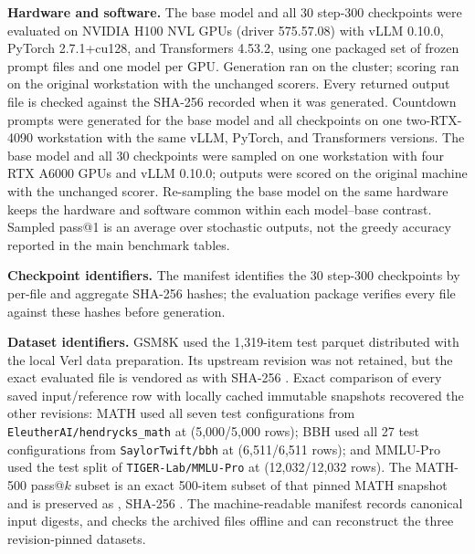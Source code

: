 \documentclass[11pt]{article}
\begin{document}
\noindent\textbf{Hardware and software.} The base model and all 30 step-300 checkpoints were evaluated on NVIDIA H100 NVL GPUs (driver 575.57.08) with
vLLM 0.10.0, PyTorch 2.7.1+cu128, and Transformers 4.53.2, using one packaged set of frozen prompt files and
one model per GPU. Generation ran on the cluster; scoring ran on the original workstation with the unchanged
scorers. Every returned output file is checked against the SHA-256 recorded when it was generated. Countdown prompts were generated for the base model and all checkpoints on one two-RTX-4090 workstation with the same vLLM, PyTorch, and Transformers versions. The base model and all 30 checkpoints were sampled on one workstation with four RTX A6000 GPUs and vLLM 0.10.0; outputs were scored on the original machine with the unchanged scorer. Re-sampling the base model on the same hardware keeps the hardware and software common within each model--base contrast. Sampled pass@1 is an average over stochastic outputs, not the greedy accuracy reported in the main benchmark tables.

\noindent\textbf{Checkpoint identifiers.} The manifest  identifies the 30 step-300 checkpoints by per-file and aggregate SHA-256 hashes; the evaluation package verifies every file against these hashes before generation.

\noindent\textbf{Dataset identifiers.} GSM8K used the 1,319-item test parquet distributed with the local Verl data preparation. Its upstream revision
was not retained, but the exact evaluated file is vendored as  with SHA-256
. Exact comparison of every saved
input/reference row with locally cached immutable snapshots recovered the other revisions: MATH used all seven
test configurations from \texttt{EleutherAI/hendrycks\_math} at
 (5,000/5,000 rows); BBH used all 27 test configurations from
\texttt{SaylorTwift/bbh} at  (6,511/6,511 rows); and MMLU-Pro
used the test split of \texttt{TIGER-Lab/MMLU-Pro} at
 (12,032/12,032 rows). The MATH-500 pass@$k$ subset is an exact
500-item subset of that pinned MATH snapshot and is preserved as , SHA-256
. The machine-readable manifest
 records canonical input digests, and 
checks the archived files offline and can reconstruct the three revision-pinned datasets.
\end{document}
